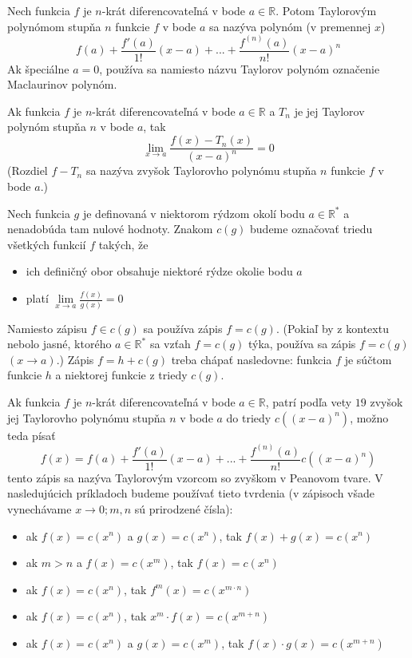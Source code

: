 Nech funkcia $f$ je $n$-krát diferencovateľná v bode $a\in\mathbb{R}$. Potom
Taylorovým polynómom stupňa $n$ funkcie $f$ v bode $a$ sa nazýva polynóm (v
premennej $x$)
\[
  f(a)+\frac{f'(a)}{1!}(x-a)+...+\frac{f^{(n)}(a)}{n!}(x-a)^n
\]
Ak špeciálne $a=0$, používa sa namiesto názvu Taylorov polynóm označenie
Maclaurinov polynóm.

\begin{veta}
Ak funkcia $f$ je $n$-krát diferencovateľná v bode $a\in\mathbb{R}$ a $T_n$ je
jej Taylorov polynóm stupňa $n$ v bode $a$, tak
\[
  \lim_{x \rightarrow a}\frac{f(x)-T_n(x)}{(x-a)^n}=0
\]
(Rozdiel $f-T_n$ sa nazýva zvyšok Taylorovho polynómu stupňa $n$ funkcie $f$ v
bode $a$.)
\end{veta}

Nech funkcia $g$ je definovaná v niektorom rýdzom okolí bodu $a\in\mathbb{R^*}$
a nenadobúda tam nulové hodnoty. Znakom $c(g)$ budeme označovať triedu všetkých
funkcií $f$ takých, že
\begin{itemize}
\item ich definičný obor obsahuje niektoré rýdze okolie bodu $a$
\item platí $\lim\limits_{x\rightarrow a}\frac{f(x)}{g(x)}=0$
\end{itemize}

Namiesto zápisu $f\in c(g)$ sa používa zápis $f=c(g)$. (Pokiaľ by z kontextu
nebolo jasné, ktorého $a\in\mathbb{R^*}$ sa vzťah $f=c(g)$ týka, používa sa
zápis $f=c(g)$ $(x\rightarrow a).$) Zápis $f=h+c(g)$ treba chápať nasledovne:
funkcia $f$ je súčtom funkcie $h$ a niektorej funkcie z triedy $c(g)$.

Ak funkcia $f$ je $n$-krát diferencovateľná v bode $a\in\mathbb{R}$, patrí podľa
vety $19$ zvyšok jej Taylorovho polynómu stupňa $n$ v bode $a$ do triedy
$c((x-a)^n)$, možno teda písať
\[
  f(x)=f(a)+\frac{f'(a)}{1!}(x-a)+...+\frac{f^{(n)}(a)}{n!}c((x-a)^n)
\]
tento zápis sa nazýva Taylorovým vzorcom so zvyškom v Peanovom tvare. V
nasledujúcich príkladoch budeme používať tieto tvrdenia (v zápisoch všade
vynechávame $x\rightarrow 0;m,n$ sú prirodzené čísla):
\begin{itemize}
\item ak $f(x)=c(x^n)$ a $g(x)=c(x^n)$, tak $f(x)+g(x)=c(x^n)$
\item ak $m>n$ a $f(x)=c(x^m)$, tak $f(x)=c(x^n)$
\item ak $f(x)=c(x^n)$, tak $f^m(x)=c(x^{m\cdot n})$
\item ak $f(x)=c(x^n)$, tak $x^m\cdot f(x)=c(x^{m+n})$
\item ak $f(x)=c(x^n)$ a $g(x)=c(x^m)$, tak $f(x)\cdot g(x)=c(x^{m+n})$
\end{itemize}

